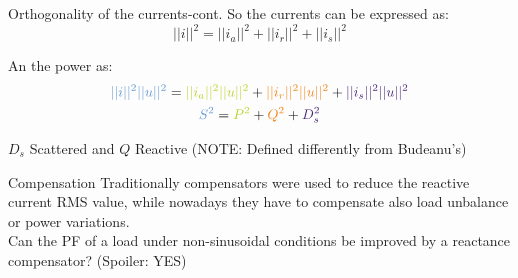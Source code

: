 \documentclass[aspectratio=169]{beamer}
\begin{document}
  \begin{frame}{Orthogonality of the currents-cont.}{\insertsection}
    So the currents can be expressed as:
    \begin{equation}
      ||i||^2 = ||i_a||^2 + ||i_r||^2 + ||i_s||^2
    \end{equation}

    \begin{figure}
      \centering
    \end{figure}
    
    An the power as:
    \begin{gather}
      \textcolor{NTNU_blue}{||i||^2||u||^2} =  \textcolor{NTNU_green}{||i_a||^2||u||^2} + \textcolor{NTNU_orange}{||i_r||^2||u||^2}  + \textcolor{NTNU_purple}{||i_s||^2||u||^2}\\
      \textcolor{NTNU_blue}{S^2} = \textcolor{NTNU_green}{P^2} + \textcolor{NTNU_orange}{Q^2} + \textcolor{NTNU_purple}{D_s^2}
    \end{gather}

    \textcolor{NTNU_purple}{$D_s$} Scattered and \textcolor{NTNU_orange}{$Q$} Reactive  (NOTE: Defined  differently from Budeanu's)

  \end{frame}

  \begin{frame}{Compensation}{{\insertsection}}
    Traditionally compensators were used to reduce the reactive current RMS value, while nowadays they have to compensate also load unbalance or power variations. \\
    \textcolor{NTNU_orange}{Can the PF of a load under non-sinusoidal conditions be improved by a reactance compensator?} \textcolor{NTNU_purple}{(Spoiler: YES)}
  \end{frame}
\end{document}
